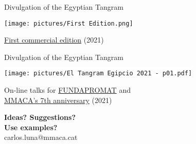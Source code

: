 \documentclass[14pt]{beamer}
\begin{document}

    \begin{frame}{Divulgation of the Egyptian Tangram}
        \begin{center}
            \texttt{[image: pictures/First Edition.png]} \\

            \smallskip

            \href{https://mmaca.cat/botiga/}{First commercial edition} (2021)
        \end{center}
    \end{frame}


    \begin{frame}{Divulgation of the Egyptian Tangram}
        \begin{center}
            \colorbox{white}{\texttt{[image: pictures/El Tangram Egipcio 2021 - p01.pdf]}} \\\medskip

            On-line talks for \href{https://www.fundapromat.org/}{FUNDAPROMAT} and\\ \href{https://www.youtube.com/watch?v=Tf-mPWFS3ik&t=7332s}{MMACA's 7th anniversary} (2021)
        \end{center}
    \end{frame}


    \begin{frame}{}
        \begin{center}
            \textbf{\huge Ideas? Suggestions?\\[0.5ex] Use examples?}\\[4ex]
            {\Large carlos.luna@mmaca.cat}
        \end{center}
    \end{frame}

\end{document}

